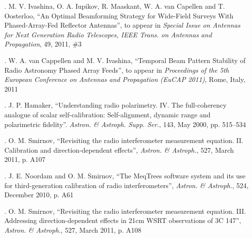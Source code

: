 \documentclass{aps2010} \special{papersize=8.5in,11in}
\begin{document}
. M. V. Ivashina, O. A. Iupikov, R. Maaskant, W. A. van Capellen and T. Oosterloo, ``An Optimal Beamforming Strategy for Wide-Field Surveys With Phased-Array-Fed Reflector Antennas'', to appear in \emph{Special Issue on Antennas for Next Generation Radio Telescopes, IEEE Trans. on Antennas and Propagation}, 49, 2011, \#3

. W. A. van Cappellen and M. V. Ivashina, ``Temporal Beam Pattern Stability of Radio Astronomy Phased Array Feeds'', to appear in 
\emph{Proceedings of the 5th European Conference on Antennas and Propagation (EuCAP 2011)}, Rome, Italy, 2011

. J. P. Hamaker, ``Understanding radio polarimetry. IV. The full-coherency analogue of scalar self-calibration: Self-alignment, dynamic range and polarimetric fidelity''.
\emph{Astron. \& Astroph. Supp. Ser.}, 143, May 2000, pp. 515--534


. O. M. Smirnov, ``Revisiting the radio interferometer measurement equation. II. Calibration and direction-dependent effects'',
\emph{Astron. \& Astroph.}, 527, March 2011, p. A107

. J. E. Noordam and O. M. Smirnov, ``The MeqTrees software system and its use for third-generation calibration of radio interferometers'',
\emph{Astron. \& Astroph.}, 524, December 2010, p. A61

. O. M. Smirnov, ``Revisiting the radio interferometer measurement equation. III. Addressing direction-dependent effects in 21cm WSRT observations of 3C 147'',
\emph{Astron. \& Astroph.}, 527, March 2011, p. A108
\end{document}
